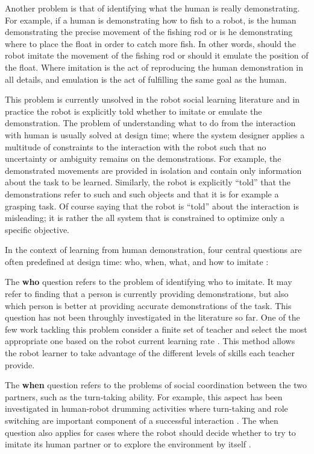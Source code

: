 Another problem is that of identifying what the human is really demonstrating. For example, if a human is demonstrating how to fish to a robot, is the human demonstrating the precise movement of the fishing rod or is he demonstrating where to place the float in order to catch more fish. In other words, should the robot imitate the movement of the fishing rod or should it emulate the position of the float. Where imitation is the act of reproducing the human demonstration in all details, and emulation is the act of fulfilling the same goal as the human.

This problem is currently unsolved in the robot social learning literature and in practice the robot is explicitly told whether to imitate or emulate the demonstration. The problem of understanding what to do from the interaction with human is usually solved at design time; where the system designer applies a multitude of constraints to the interaction with the robot such that no uncertainty or ambiguity remains on the demonstrations. For example, the demonstrated movements are provided in isolation and contain only information about the task to be learned. Similarly, the robot is explicitly ``told'' that the demonstrations refer to such and such objects and that it is for example a grasping task. Of course saying that the robot is ``told'' about the interaction is misleading; it is rather the all system that is constrained to optimize only a specific objective.

In the context of learning from human demonstration, four central questions are often predefined at design time: who, when, what, and how to imitate \cite{nehaniv2000hummingbirds}:

The \textbf{who} question refers to the problem of identifying who to imitate. It may refer to finding that a person is currently providing demonstrations, but also which person is better at providing accurate demonstrations of the task. This question has not been throughly investigated in the literature so far. One of the few work tackling this problem consider a finite set of teacher and select the most appropriate one based on the robot current learning rate \cite{Nguyen2012PJBR}. This method allows the robot learner to take advantage of the different levels of skills each teacher provide.

The \textbf{when} question refers to the problems of social coordination between the two partners, such as the turn-taking ability. For example, this aspect has been investigated in human-robot drumming activities where turn-taking and role switching are important component of a successful interaction \cite{weinberg2006robot,kose2008emergent}. The when question also applies for cases where the robot should decide whether to try to imitate its human partner or to explore the environment by itself \cite{chernova09jair,Nguyen2012PJBR}. 

